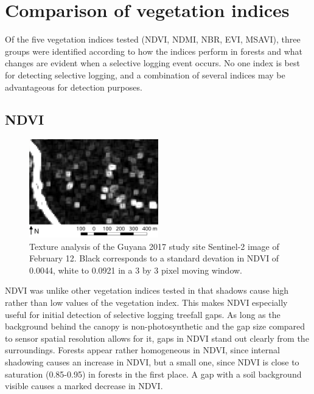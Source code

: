 \documentclass[a4paper,12pt]{scrbook}
\begin{document}

\section{Comparison of vegetation indices}

Of the five vegetation indices tested (\ac{NDVI}, \ac{NDMI}, \ac{NBR}, \ac{EVI}, \ac{MSAVI}), three groups were identified according to how the indices perform in forests and what changes are evident when a selective logging event occurs. No one index is best for detecting selective logging, and a combination of several indices may be advantageous for detection purposes.

\subsection{NDVI}

\begin{figure}
  \centering
  \includegraphics[width=0.5\textwidth]{thesis-figures/16-guyana17-ndvi-texture}
  \caption{Texture analysis of the Guyana 2017 study site Sentinel-2 image of February 12. Black corresponds to a standard devation in \ac{NDVI} of 0.0044, white to 0.0921 in a 3 by 3 pixel moving window.}
  \label{fig-ndvi-texture}
\end{figure}

\ac{NDVI} was unlike other vegetation indices tested in that shadows cause high rather than low values of the vegetation index. This makes \ac{NDVI} especially useful for initial detection of selective logging treefall gaps. As long as the background behind the canopy is non-photosynthetic and the gap size compared to sensor spatial resolution allows for it, gaps in \ac{NDVI} stand out clearly from the surroundings. Forests appear rather homogeneous in \ac{NDVI}, since internal shadowing causes an increase in \ac{NDVI}, but a small one, since \ac{NDVI} is close to saturation (0.85-0.95) in forests in the first place. A gap with a soil background visible causes a marked decrease in \ac{NDVI}.
\end{document}
